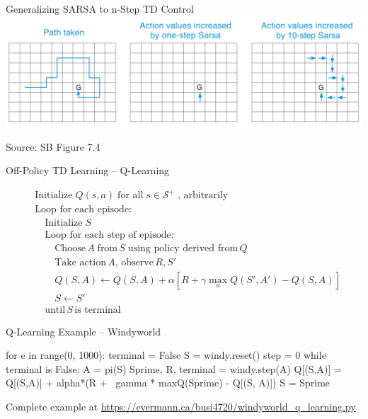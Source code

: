 \documentclass[ignorenonframetext,xcolor=x11names]{beamer}
\begin{document}
\begin{frame}{Generalizing SARSA to n-Step TD Control}
\includegraphics[width=\textwidth]{screen7.png}
\centering

\scriptsize
Source: SB Figure 7.4
\end{frame}


\begin{frame}{Off-Policy TD Learning -- Q-Learning}
\begin{block}{}
\begin{align*}
& \text{Initialize}\; Q(s, a) \; \text{for all} \; s \in \mathcal{S}^+ \; \text{, arbitrarily} \\
& \text{Loop for each episode:} \\
& \quad \text{Initialize}\; S \\
& \quad \text{Loop for each step of episode:} \\
& \quad \quad \text{Choose} \, A \; \text{from}\, S \; \text{using policy derived from} \, Q \\
& \quad \quad \text{Take action}\, A, \, \text{observe} \, R, S' \\
& \quad \quad Q(S, A) \leftarrow Q(S, A) + \alpha \left[ R + \gamma \operatorname*{max}_a Q(S', A') - Q(S, A) \right] \\
& \quad \quad S \leftarrow S' \\
& \quad \text{until}\, S\, \text{is terminal}
\end{align*}
\end{block}
\end{frame}

\begin{frame}[fragile]{Q-Learning Example -- Windyworld}
\begin{pythoncode}
for e in range(0, 1000):
    terminal = False
    S = windy.reset()
    step = 0
    while terminal is False:
        A = pi(S)
        Sprime, R, terminal = windy.step(A)
        Q[(S,A)] = Q[(S,A)] + alpha*(R + \
            gamma * maxQ(Sprime) - Q[(S, A)])
        S = Sprime
\end{pythoncode}

Complete example at \url{https://evermann.ca/busi4720/windyworld_q_learning.py}
\end{frame}
\end{document}
